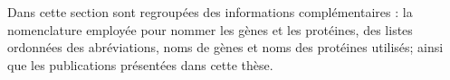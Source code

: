 \singlespacing

		\begin{center}
			\begin{tcolorbox}[colback=black!5!white,colframe=white!15!black,arc=0mm]
				\sffamily
				Dans cette section sont regroupées des informations complémentaires : la nomenclature employée pour nommer les gènes et les protéines, des listes ordonnées des abréviations, noms de gènes et noms des protéines utilisés; ainsi que les publications présentées dans cette thèse.
			\end{tcolorbox}
			\vspace{5ex}
			\minitoc
		\end{center}
